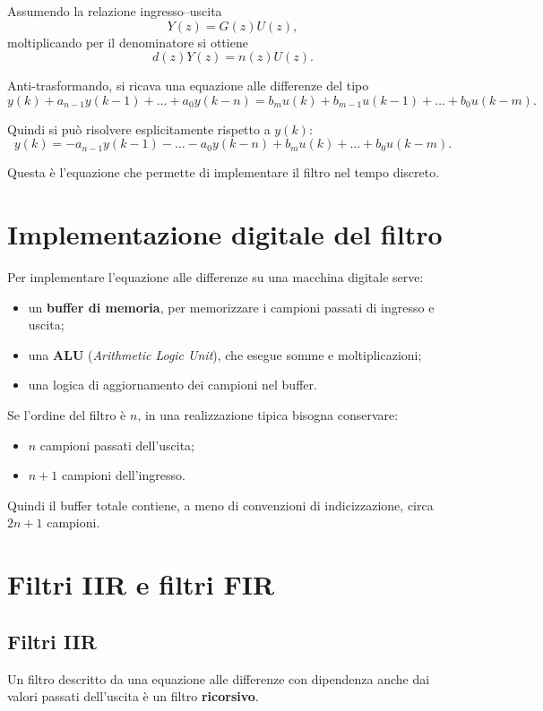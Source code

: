 Assumendo la relazione ingresso--uscita
\[
Y(z)=G(z)U(z),
\]
moltiplicando per il denominatore si ottiene
\[
d(z)Y(z)=n(z)U(z).
\]

Anti-trasformando, si ricava una equazione alle differenze del tipo
\[
y(k)+a_{n-1}y(k-1)+\dots+a_0 y(k-n)
=
b_m u(k)+b_{m-1}u(k-1)+\dots+b_0 u(k-m).
\]

Quindi si pu\`o risolvere esplicitamente rispetto a \(y(k)\):
\[
y(k)=
-a_{n-1}y(k-1)-\dots-a_0y(k-n)
+b_m u(k)+\dots+b_0u(k-m).
\]

Questa \`e l'equazione che permette di implementare il filtro nel tempo discreto.

\section{Implementazione digitale del filtro}

Per implementare l'equazione alle differenze su una macchina digitale serve:
\begin{itemize}
    \item un \textbf{buffer di memoria}, per memorizzare i campioni passati di ingresso e uscita;
    \item una \textbf{ALU} (\emph{Arithmetic Logic Unit}), che esegue somme e moltiplicazioni;
    \item una logica di aggiornamento dei campioni nel buffer.
\end{itemize}

Se l'ordine del filtro \`e \(n\), in una realizzazione tipica bisogna conservare:
\begin{itemize}
    \item \(n\) campioni passati dell'uscita;
    \item \(n+1\) campioni dell'ingresso.
\end{itemize}

Quindi il buffer totale contiene, a meno di convenzioni di indicizzazione,
circa \(2n+1\) campioni.

\section{Filtri IIR e filtri FIR}

\subsection{Filtri IIR}

Un filtro descritto da una equazione alle differenze con dipendenza
anche dai valori passati dell'uscita \`e un filtro \textbf{ricorsivo}.

